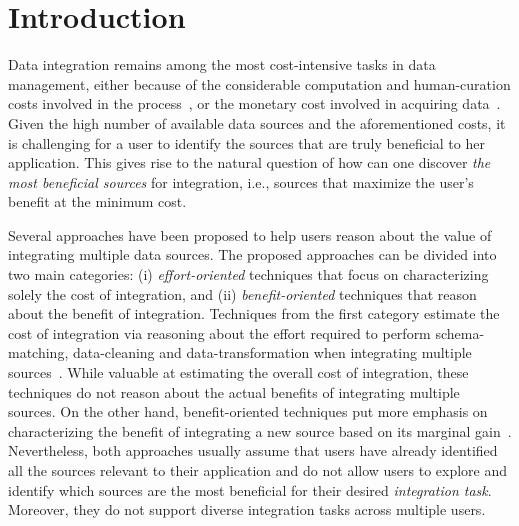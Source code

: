 \documentclass{vldb}
\begin{document}
\section{Introduction}
Data integration remains among the most cost-intensive tasks in data management, either because of the considerable computation and human-curation costs involved in the process~\cite{kruse2015estimating}, or the monetary cost involved in acquiring data~\cite{balazinska:vldb11}. Given the high number of available data sources and the aforementioned costs, it is challenging for a user to identify the sources that are truly beneficial to her application. This gives rise to the natural question of how can one discover {\em the most beneficial sources} for integration, i.e., sources that maximize the user's benefit at the minimum cost. 

Several approaches have been proposed to help users reason about the value of integrating multiple data sources. The proposed approaches can be divided into two main categories: (i) {\em effort-oriented} techniques that focus on characterizing solely the cost of integration, and (ii) {\em benefit-oriented} techniques that reason about the benefit of integration. Techniques from the first category estimate the cost of integration via reasoning about the effort required to perform schema-matching, data-cleaning and data-transformation when integrating multiple sources~\cite{kruse2015estimating, smith:2009}. While valuable at estimating the overall cost of integration, these techniques do not reason about the actual benefits of integrating multiple sources. On the other hand, benefit-oriented techniques put more emphasis on characterizing the benefit of integrating a new source based on its marginal gain~\cite{dong:vldb13,rekatsinas:2014}. Nevertheless, both approaches usually assume that users have already identified all the sources relevant to their application and do not allow users to explore and identify which sources are the most beneficial for their desired {\em integration task}. Moreover, they do not support diverse integration tasks across multiple users.
\end{document}
